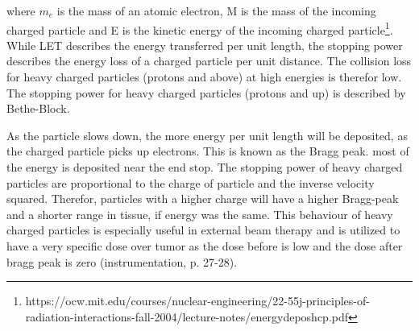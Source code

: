 \documentclass[a4paper,11pt,twoside]{book}
\begin{document}
where $m_e$ is the mass of an atomic electron, M is the mass of the incoming charged particle and E is the kinetic energy of the incoming charged particle\footnote{https://ocw.mit.edu/courses/nuclear-engineering/22-55j-principles-of-radiation-interactions-fall-2004/lecture-notes/energydeposhcp.pdf}. While LET describes the energy transferred per unit length, the stopping power describes the energy loss of a charged particle per unit distance. The collision loss for heavy charged particles (protons and above) at high energies is therefor low. The stopping power for heavy charged particles (protons and up) is described by Bethe-Block.

 As the particle slows down, the more energy per unit length will be deposited, as the charged particle picks up electrons. This is known as the Bragg peak. most of the energy is deposited near the end stop. The stopping power of heavy charged particles are proportional to the charge of particle and the inverse velocity squared. Therefor, particles with a higher charge will have a higher Bragg-peak and a shorter range in tissue, if energy was the same. This behaviour of heavy charged particles is especially useful in external beam therapy and is utilized to have a very specific dose over tumor as the dose before is low and the dose after bragg peak is zero (instrumentation, p. 27-28). \\
\end{document}
